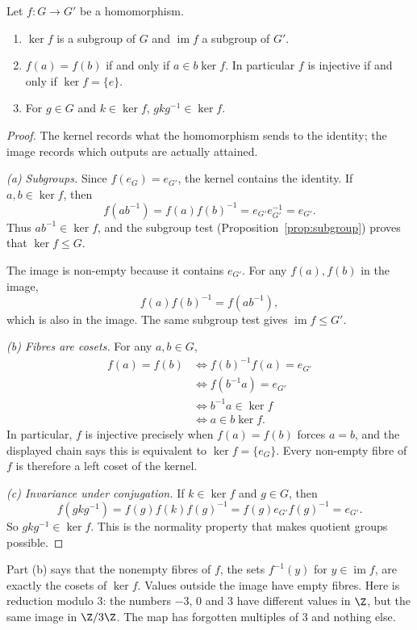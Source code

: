 \begin{proposition}\label{prop:kerim}
Let $f:G\to G'$ be a homomorphism.
\begin{enumerate}[label=(\alph*)]
\item $\ker f$ is a subgroup of $G$ and $\operatorname{im}f$ a subgroup of $G'$.
\item $f(a)=f(b)$ if and only if $a\in b\ker f$. In particular $f$ is injective if and only if $\ker f=\{e\}$.
\item For $g\in G$ and $k\in\ker f$, $gkg^{-1}\in\ker f$.
\end{enumerate}
\end{proposition}
\begin{proof}
The kernel records what the homomorphism sends to the identity;
the image records which outputs are actually attained.

\emph{(a) Subgroups.}
Since $f(e_G)=e_{G'}$, the kernel contains the identity.
If $a,b\in\ker f$, then
\[
f(ab^{-1})=f(a)f(b)^{-1}
=e_{G'}e_{G'}^{-1}=e_{G'}.
\]
Thus $ab^{-1}\in\ker f$, and the subgroup test
(Proposition~\ref{prop:subgroup}) proves that $\ker f\le G$.

The image is non-empty because it contains $e_{G'}$.
For any $f(a),f(b)$ in the image,
\[
f(a)f(b)^{-1}=f(ab^{-1}),
\]
which is also in the image. The same subgroup test
gives $\operatorname{im}f\le G'$.

\emph{(b) Fibres are cosets.}
For any $a,b\in G$,
\[
\begin{aligned}
f(a)=f(b)
&\iff f(b)^{-1}f(a)=e_{G'}\\
&\iff f(b^{-1}a)=e_{G'}\\
&\iff b^{-1}a\in\ker f\\
&\iff a\in b\ker f.
\end{aligned}
\]
In particular, $f$ is injective precisely when
$f(a)=f(b)$ forces $a=b$, and the displayed chain
says this is equivalent to $\ker f=\{e_G\}$.
Every non-empty fibre of $f$ is therefore a
left coset of the kernel.

\emph{(c) Invariance under conjugation.}
If $k\in\ker f$ and $g\in G$, then
\[
f(gkg^{-1})
=f(g)f(k)f(g)^{-1}
=f(g)e_{G'}f(g)^{-1}
=e_{G'}.
\]
So $gkg^{-1}\in\ker f$. This is the normality
property that makes quotient groups possible.
\end{proof}

Part (b) says that the nonempty fibres of $f$, the sets $f^{-1}(y)$ for $y\in\operatorname{im}f$, are exactly the cosets of $\ker f$. Values outside the image have empty fibres. Here is reduction modulo $3$: the numbers $-3$, $0$ and $3$ have different values in $\Z$, but the same image in $\Z/3\Z$. The map has forgotten multiples of $3$ and nothing else.

